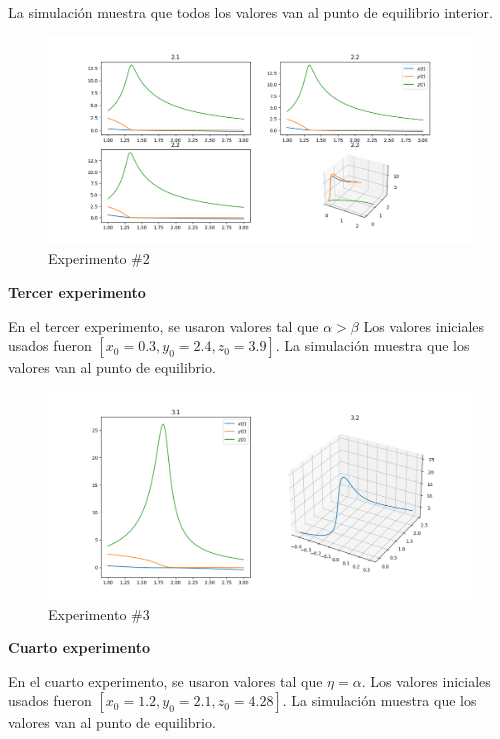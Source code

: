 \documentclass{wscpaperproc}
\theoremstyle{wsc}
\begin{document}
La simulación muestra que todos los valores van al punto de equilibrio interior.

\begin{figure}[h!]
	\includegraphics[width=\linewidth]{./images/2.png}
	\caption{Experimento \#2}
\end{figure}

\vspace*{1cm}
{\bf Tercer experimento}

En el tercer experimento, se usaron valores tal que $\alpha > \beta$
Los valores iniciales usados fueron $[x_0=0.3, y_0=2.4, z_0=3.9]$. La simulación muestra
que los valores van al punto de equilibrio.

\begin{figure}[h!]
	\includegraphics[width=\linewidth]{./images/3.png}
	\caption{Experimento \#3}
\end{figure}

\vspace*{0.5cm}
{\bf Cuarto experimento}

En el cuarto experimento, se usaron valores tal que $\eta = \alpha$.
Los valores iniciales usados fueron $[x_0=1.2, y_0=2.1, z_0=4.28]$. La simulación muestra
que los valores van al punto de equilibrio.
\end{document}
